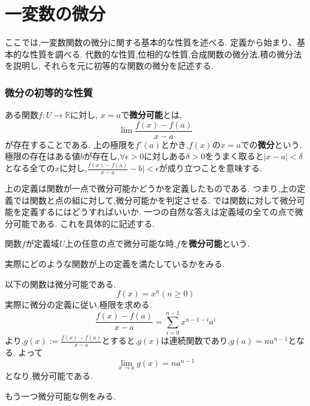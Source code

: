 \part{一変数の微分}
ここでは,一変数関数の微分に関する基本的な性質を述べる.
定義から始まり、基本的な性質を調べる.
代数的な性質,位相的な性質,合成関数の微分法,積の微分法を説明し,
それらを元に初等的な関数の微分を記述する.
\section{微分の初等的な性質}

\begin{dfn}[微分]
ある関数$f:U \to \mathbb{R}$に対し,
$x=a$で\textbf{微分可能}とは,
\begin{equation*}
\lim \frac{f(x) - f(a)}{x-a}
\end{equation*}
が存在することである.
上の極限を$f'(a)$とかき,$f(x)$の$x=a$での\textbf{微分}という.
極限の存在はある値$b$が存在し,$\forall \epsilon > 0$に対しある$\delta > 0$をうまく取ると$|x - a| < \delta$となる全ての$x$に対し,$\frac{f(x) - f(a)}{x-a} - b| < \epsilon$が成り立つことを意味する.
\end{dfn}

上の定義は関数が一点で微分可能かどうかを定義したものである.
つまり,上の定義では関数と点の組に対して,微分可能かを判定させる.
では関数に対して微分可能を定義するにはどうすればいいか.
一つの自然な答えは定義域の全ての点で微分可能である.
これを具体的に記述する.
\begin{dfn}
関数$f$が定義域$U$上の任意の点で微分可能な時,$f$を\textbf{微分可能}という.
\end{dfn}


実際にどのような関数が上の定義を満たしているかをみる.


\begin{epl}
以下の関数は微分可能である.
\begin{equation*}
f(x) = x^n (n \ge 0)
\end{equation*}
実際に微分の定義に従い,極限を求める.
\begin{equation*}
\frac{f(x) - f(a)}{x-a}= \sum_{i=0}^{n-1} x^{n-1-i}a^i
\end{equation*}
より,$g(x):=\frac{f(x) - f(a)}{x-a}$とすると,$g(x)$は連続関数であり,$g(a) = na^{n-1}$となる.
よって
\begin{equation*}
\lim_{x \to a} g(x) = na^{n-1}
\end{equation*}
となり,微分可能である.
\end{epl}


もう一つ微分可能な例をみる.

